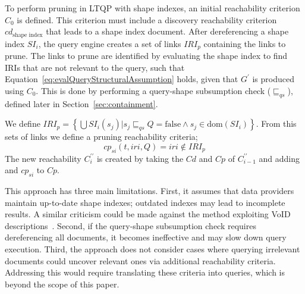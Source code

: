 To perform pruning in LTQP with shape indexes, an initial reachability criterion $C_0$ is defined.
This criterion must include a discovery reachability criterion $cd_{\text{shape index}}$ that leads to a shape index document.  
After dereferencing a shape index $SI_i$, the query engine creates a set of links $IRI_p$ containing the links to prune.  
The links to prune are identified by evaluating the shape index to find IRIs that are not relevant to the query, such that Equation~\ref{eq:evalQueryStructuralAssumption} holds, given that $G^{\prime}$ is produced using $C_0$.  
This is done by performing a query-shape subsumption check ($\sqsubseteq_{qs}$), defined later in Section~\ref{sec:containment}.

We define
$IRI_p = \left\{ \bigcup SI_i(s_j) | s_j \sqsubseteq_{qs}  Q = \mathrm{false} \land s_j \in \text{dom}(SI_i) \right\}$.
From this sets of links we define a pruning reachability criteria;
\begin{equation}
       cp_{si}(t, iri, Q) = iri \notin IRI_p
\end{equation}
The new reachability $C^{\prime\prime}_i$ is created by taking the $Cd$ and $Cp$ of $C^{\prime\prime}_{i-1}$ and adding
and $cp_{si}$ to $Cp$.

This approach has three main limitations.  
First, it assumes that data providers maintain up-to-date shape indexes; outdated indexes may lead to incomplete results.
A similar criticism could be made against the method exploiting VoID descriptions~\cite{Montoya2017}.
Second, if the query-shape subsumption check requires dereferencing all documents, it becomes ineffective and may slow down query execution.  
Third, the approach does not consider cases where querying irrelevant documents could uncover relevant ones via additional reachability criteria.  
Addressing this would require translating these criteria into queries, which is beyond the scope of this paper.

